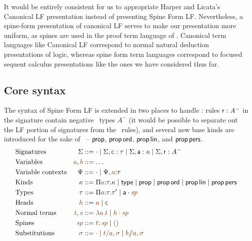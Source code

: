 It would be entirely consistent for us to appropriate Harper and
Licata's Canonical LF presentation instead of presenting Spine Form
LF. Nevertheless, a spine-form presentation of canonical LF serves to
make our presentation more uniform, as spines are used in the proof
term language of \sls. Canonical term languages like Canonical LF
correspond to normal natural deduction presentations of logic, whereas
spine form term languages correspond to focused sequent calculus
presentations like the ones we have considered thus far.

\subsection{Core syntax}

The syntax of Spine Form LF is extended in two places to handle \sls:
rules ${\sf r} : A^-$ in the signature contain negative \sls~types
$A^-$ (it would be possible to separate out the LF portion of
signatures from the \sls~rules), and several new base kinds
are introduced for the sake of \sls~-- ${\sf prop}$, ${\sf prop}\,{\sf
  ord}$, ${\sf prop}\,{\sf lin}$, and ${\sf prop}\,{\sf pers}$.
\begin{align*}
& \mbox{Signatures} & \Sigma & ::= \cdot 
  \mid \Sigma, \lf{\sf c} : \tau
  \mid \Sigma, {\sf a} : \kappa
  \mid \Sigma, {\sf r} : A^-
\\
& \mbox{Variables} & \lf{a}, \lf{b} & ::= \ldots
\\
& \mbox{Variable contexts} & \Psi & ::= \cdot
  \mid \Psi, \lf{a} {:} \tau 
\\
& \mbox{Kinds} & \kappa & ::=  \lfpi{a}{\tau}{\kappa} 
  \mid {\sf type}
  \mid {\sf prop}
  \mid {\sf prop}\,{\sf ord}
  \mid {\sf prop}\,{\sf lin}
  \mid {\sf prop}\,{\sf pers}
\\
& \mbox{Types} & \tau & ::= \lfpi{a}{\tau}{\tau'} 
  \mid \lfroot{\sf a}{\spi}
\\
& \mbox{Heads} & \lf{h} & ::= \lf{a} \mid \lf{\sf c}
\\
& \mbox{Normal terms} & \lf{t}, \lf{s} & ::= \lf{\lambda a.t}
  \mid \lf{\lfroot{h}{\spi}}
\\
& \mbox{Spines} & \lf{\spi} & ::= \lf{t; \spi} \mid \lf{\lfnil}
\\
& \mbox{Substitutions} & \lf{\sigma} & ::= \lf{\cdot}
  \mid \lf{t/a, \sigma}
  \mid \lf{b/\!\!/a, \sigma}
\end{align*}
